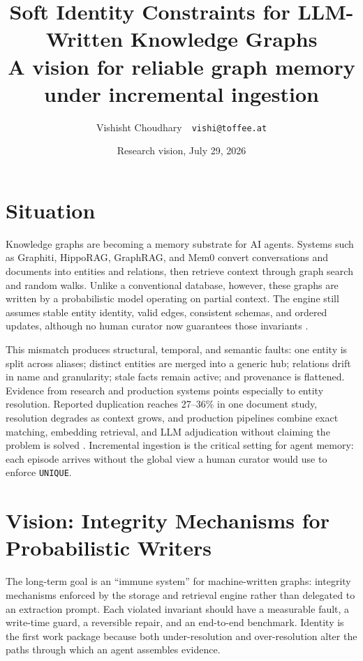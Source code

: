 \documentclass[10pt]{article}
\title{\vspace{-1.6em}\Large\textbf{Soft Identity Constraints for LLM-Written Knowledge Graphs}\\[0.15em]
\normalsize A vision for reliable graph memory under incremental ingestion\vspace{-0.5em}}
\author{\normalsize Vishisht Choudhary \,\textperiodcentered\, \texttt{vishi@toffee.at}}
\date{\normalsize Research vision, July 29, 2026\vspace{-1.3em}}
\begin{document}
\maketitle

\section{Situation}

Knowledge graphs are becoming a memory substrate for AI agents. Systems such as
Graphiti, HippoRAG, GraphRAG, and Mem0 convert conversations and documents into
entities and relations, then retrieve context through graph search and random walks.
Unlike a conventional database, however, these graphs are written by a probabilistic
model operating on partial context. The engine still assumes stable entity identity,
valid edges, consistent schemas, and ordered updates, although no human curator now
guarantees those invariants \cite{zep,hipporag,hipporag2,mem0,graphbench}.

This mismatch produces structural, temporal, and semantic faults: one entity is split
across aliases; distinct entities are merged into a generic hub; relations drift in
name and granularity; stale facts remain active; and provenance is flattened. Evidence
from research and production systems points especially to entity resolution. Reported
duplication reaches 27--36\% in one document study, resolution degrades as context
grows, and production pipelines combine exact matching, embedding retrieval, and LLM
adjudication without claiming the problem is solved
\cite{linkkg,itext2kg,kggen,cai,degrag}. Incremental ingestion is the critical setting for agent memory:
each episode arrives without the global view a human curator would use to enforce
\texttt{UNIQUE}.

\section{Vision: Integrity Mechanisms for Probabilistic Writers}

The long-term goal is an ``immune system'' for machine-written graphs: integrity
mechanisms enforced by the storage and retrieval engine rather than delegated to an
extraction prompt. Each violated invariant should have a measurable fault, a
write-time guard, a reversible repair, and an end-to-end benchmark. Identity is the
first work package because both under-resolution and over-resolution alter the paths
through which an agent assembles evidence.
\end{document}
